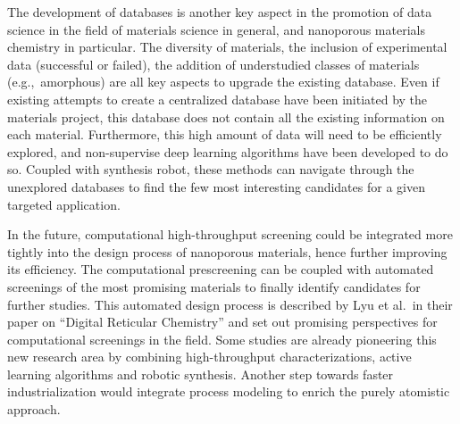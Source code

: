 \documentclass[main.tex]{subfiles}
\begin{document}
The development of databases is another key aspect in the promotion of data science in the field of materials science in general, and nanoporous materials chemistry in particular. The diversity of materials, the inclusion of experimental data (successful or failed), the addition of understudied classes of materials (e.g.,\ amorphous) are all key aspects to upgrade the existing database. Even if existing attempts to create a centralized database have been initiated by the materials project,\autocite{MaterialsProject} this database does not contain all the existing information on each material. Furthermore, this high amount of data will need to be efficiently explored, and non-supervise deep learning algorithms have been developed to do so.\autocite{Park_2023} Coupled with synthesis robot, these methods can navigate through the unexplored databases to find the few most interesting candidates for a given targeted application.

In the future, computational high-throughput screening could be integrated more tightly into the design process of nanoporous materials, hence further improving its efficiency. The computational prescreening can be coupled with automated screenings of the most promising materials to finally identify candidates for further studies. This automated design process is described by Lyu et al.\ in their paper on ``Digital Reticular Chemistry'' and set out promising perspectives for computational screenings in the field.\autocite{Lyu_2020} Some studies are already pioneering this new research area by combining high-throughput characterizations, active learning algorithms and robotic synthesis.\autocite{Greenaway_2018,Moosavi_2019} Another step towards faster industrialization would integrate process modeling to enrich the purely atomistic approach.

\OnlyInSubfile{\printglobalbibliography}
\end{document}
